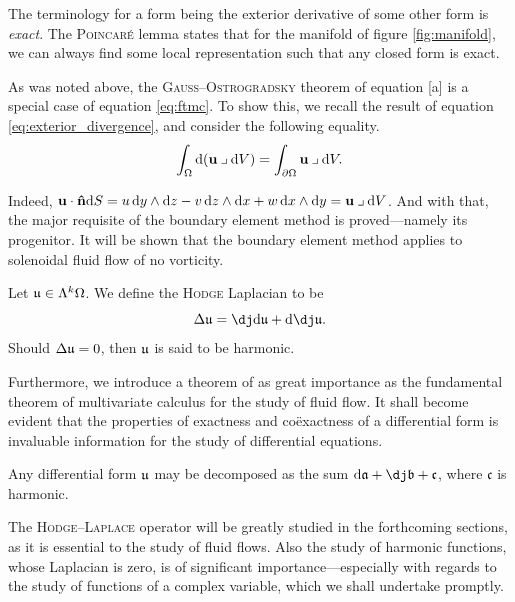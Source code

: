 \noindent The terminology for a form being the exterior derivative of some other form is \emph{exact}.
The \textsc{Poincaré} lemma states that for the manifold of figure \ref{fig:manifold}, we can always find some local representation such that any closed form is exact.

As was noted above, the \textsc{Gauss}--\textsc{Ostrogradsky} theorem of equation \subeqref{\ref{eq:divergence_curl}}[a] is a special case of equation \eqref{eq:ftmc}.
To show this, we recall the result of equation \eqref{eq:exterior_divergence}, and consider the following equality.
\[
        \int_{\Omega} \dee(\uvec\iprod\dee V) = \int_{\partial\Omega} \uvec\iprod\dee V.
\]

\noindent
Indeed, $\uvec\cdot\nhat\dee S = u\,\dee y\wedge\dee z - v\,\dee z\wedge\dee x + w\,\dee x\wedge\dee y = \uvec\iprod\dee V$.
And with that, the major requisite of the boundary element method is proved---namely its progenitor.
It will be shown that the boundary element method applies to solenoidal fluid flow of no vorticity.

\begin{definition}
  Let $\mathfrak{u} \in \Lambda^{k}\Omega$.
  We define the \textsc{Hodge} Laplacian to be
  \begin{equation}\label{eq:Hodge_laplacian}
    \Delta \ufrak = \codee \dee \ufrak + \dee \codee \ufrak.
  \end{equation}
  Should $\Delta \mathfrak{u} = 0$, then $\mathfrak{u}$ is said to be harmonic.
\end{definition}

\noindent
Furthermore, we introduce a theorem of as great importance as the fundamental theorem of multivariate calculus for the study of fluid flow.
It shall become evident that the properties of exactness and coëxactness of a differential form is invaluable information for the study of differential equations.

\begin{theorem}\label{thm:Hodge_decomposition}
  Any differential form $\mathfrak{u}$ may be decomposed as the sum $\dee \afrak + \codee \bfrak + \mathfrak{c}$, where $\mathfrak{c}$ is harmonic.
\end{theorem}

\noindent
The \textsc{Hodge}--\textsc{Laplace} operator will be greatly studied in the forthcoming sections, as it is essential to the study of fluid flows.
Also the study of harmonic functions, whose Laplacian is zero, is of significant importance---especially with regards to the study of functions of a complex variable, which we shall undertake promptly.

